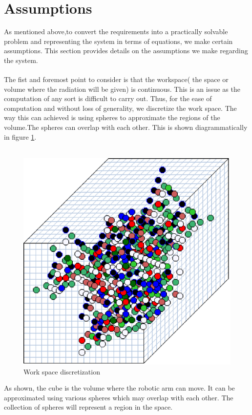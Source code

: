 \documentclass[10pt]{report}
\begin{document}
\section{Assumptions}
\label{assumptions}
As mentioned above,to convert the requirements into a practically solvable problem and representing the system in terms of equations, we make certain assumptions. This section provides details on the assumptions we make regarding the system.
\\
\\
The fist and foremost point to consider is that the workspace( the space or volume where the radiation will be given) is continuous. This is an issue as the computation of any sort is difficult to carry out. Thus, for the ease of computation and without loss of generality, we discretize the work space.
The way this can achieved is using spheres to approximate the regions of the volume.The spheres can overlap with each other.
This is shown diagrammatically in figure \ref{fig_workspace}. 
\\
\\
\begin{figure}[h]
\includegraphics[scale=0.5]{resources/images/workspace.eps} 
\caption{Work space discretization}
\label{fig_workspace}
\end{figure}
As shown, the cube is the volume where the robotic arm can move. It can be approximated using various spheres which may overlap with each other. The collection of spheres will represent a region in the space.
\end{document}

